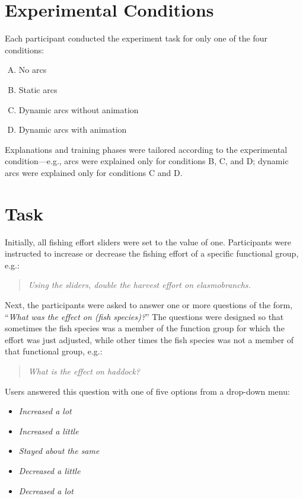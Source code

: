\section{Experimental Conditions}

Each participant conducted the experiment task for only one of the four conditions:

\begin{enumerate}[(A)]
\item No arcs
\item Static arcs
\item Dynamic arcs without animation
\item Dynamic arcs with animation
\end{enumerate}

Explanations and training phases were tailored according to the experimental condition---e.g., arcs were explained only for conditions B, C, and D; dynamic arcs were explained only for conditions C and D.

\section{Task}

Initially, all fishing effort sliders were set to the value of one.  Participants were  instructed to increase or decrease the fishing effort of a specific functional group, e.g.:
\begin{quote}
\textit{Using the sliders, double the harvest effort on elasmobranchs.}
\end{quote}

Next, the participants were asked to answer one or more questions of the form, ``\textit{What was the effect on (fish species)?}''  The questions were designed so that sometimes the fish species was a member of the function group for which the effort was just adjusted, while other times the fish species was not a member of that functional group, e.g.:
\begin{quote}
\textit{What is the effect on haddock?}
\end{quote}
Users answered this question with one of five options from a drop-down menu:
\begin{itemize}
\item \textit{Increased a lot}
\item \textit{Increased a little}
\item \textit{Stayed about the same}
\item \textit{Decreased a little}
\item \textit{Decreased a lot}
\end{itemize}

